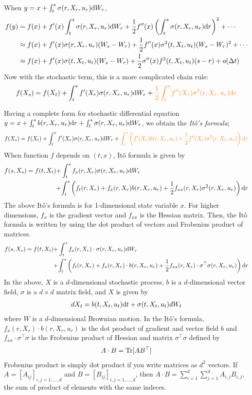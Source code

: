 \documentclass[11pt]{book}
\newcommand{\dt}{\text{\normalfont d}t}
\newcommand{\dr}{\text{\normalfont d}r}
\newcommand{\dW}{\text{\normalfont d}W}
\begin{document}
When $y=x+\int_t^s \sigma(r,X_r,u_r)\dW_r$, 
\[
\begin{split}
f(y)& = f(x) + f^{\prime}(x)\int_t^s \sigma(r,X_r,u_r)\dW_r + \frac12f^{\prime\prime}(x) \left(\int_t^s \sigma(r,X_r,u_r)\dr\right)^2 + \cdots\\
& \approx f(x) + f^{\prime}(x) \sigma(r,X_r,u_r)(W_s-W_r) + \frac12f^{\prime\prime}(x) \sigma^2(t,X_t,u_t)(W_s-W_r)^2 + \cdots\\
& \approx f(x) + f^{\prime}(x) \sigma(t,X_t,u_t)(W_s-W_r) + \frac12\sigma^{\prime\prime}(x) f^2(t,X_t,u_t)(s-r)+o(\Delta t)
\end{split}
\]
Now with the stochastic term, this is a more complicated chain rule:
\[
f(X_s)=f(X_t)+\int_t^s f^\prime(X_r)\sigma(r,X_r,u_r)\dW_r + {\color{orange}\frac12\int_t^s f^{\prime\prime}(X_r)\sigma^2(r,X_r,u_r)\dr}
\]

Having a complete form for stochastic differential equation $y=x+\int_t^s b(r,X_r,u_r)\dr+\int_t^s \sigma(r,X_r,u_r)\dW_r$, we obtain the \emph{Itô's formula};
\[
f(X_s)=f(X_t)+\int_t^s f^\prime(X_r)\sigma(r,X_r,u_r)\dW_r + {\color{orange}\int_t^s \left(f^\prime(X_r)b(r,X_r,u_r)+\frac12f^{\prime\prime}(X_r)\sigma^2(r,X_r,u_r)\right)\dr}
\]
When function $f$ depends on $(t,x)$, 
Itô formula is given by
\[
\begin{split}
    f(s,X_s)=f(t,X_t)+&\int_t^s f_x(r,X_r)\sigma(r,X_r,u_r)\dW_r\\
    +& {\int_t^s \left(f_t(r,X_r)+f_x(r,X_r)b(r,X_r,u_r)+\frac12f_{xx}(r,X_r)\sigma^2(r,X_r,u_r)\right)\dr}
\end{split}
\]
The above Itô's formula is for 1-dimensional state variable $x$. For higher dimensions, $f_x$ is the gradient vector and $f_{xx}$ is the Hessian matrix. Then, the Itô formula is written by using the dot product of vectors and Frobenius product of matrices.
\[
\begin{split}
    f(s,X_s)=f(t,X_t)+&\int_t^s f_x(r,X_r)\cdot \sigma(r,X_r,u_r)\dW_r\\
    +& {\int_t^s \left(f_t(r,X_r)+f_x(r,X_r)\cdot b(r,X_r,u_r)+\frac12f_{xx}(r,X_r)\cdot\sigma^{\top}\sigma(r,X_r,u_r)\right)\dr}
\end{split}
\]
In the above, $X$ is a $d$-dimensional stochastic process, $b$ is a $d$-dimensional vector field, $\sigma$ is a $d\times d$ matrix field, and $X$ is given by
\[
dX_t = b(t,X_t,u_t)\dt +\sigma(t,X_t,u_t)dW_t
\]
where $W$ is a $d$-dimensional Brownian motion. 
In the Itô's formula, $f_x(r,X_r)\cdot b(r,X_r,u_r)$ is the dot product of gradient and vector field $b$ and $f_{xx}\cdot\sigma^{\top}\sigma$ is the Frobenius product of Hessian  and matrix $\sigma^{\top}\sigma$ defined by 
\[
A\cdot B = \text{\normalfont Tr}[AB^\top]
\]
Frobenius product is simply dot product if you write matrices as $d^2$ vectors. If $A=[A_{ij}]_{i,j=1,...,d}$ and $B=[B_{ij}]_{i,j=1,...,d}$, then 
$A\cdot B = \sum_{i=1}^d\sum_{j=1}^d A_{i,j}B_{i,j}$, the sum of product of elements with the same indeces.
\end{document}
